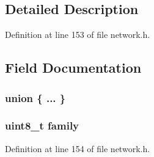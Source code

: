 \subsection{Detailed Description}


Definition at line 153 of file network.\+h.



\subsection{Field Documentation}
\hypertarget{struct_i_p_acd63477cf058774f4a8446acedfc9aff}{\subsubsection[{"@23}]{\setlength{\rightskip}{0pt plus 5cm}union \{ ... \} }}\label{struct_i_p_acd63477cf058774f4a8446acedfc9aff}
\hypertarget{struct_i_p_adad4493a852deb413bb8c515368deaac}{
\subsubsection[{family}]{\setlength{\rightskip}{0pt plus 5cm}uint8\+\_\+t family}}\label{struct_i_p_adad4493a852deb413bb8c515368deaac}


Definition at line 154 of file network.\+h.



